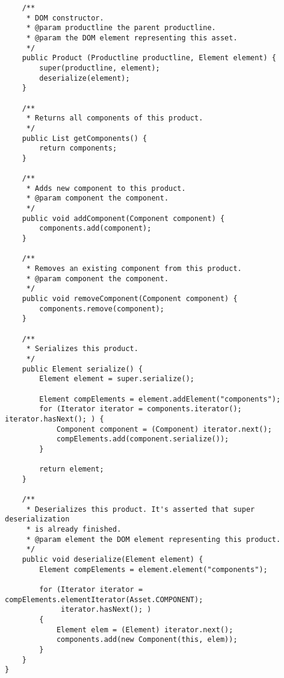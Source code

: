 \begin{verbatim}
	/**
	 * DOM constructor.
	 * @param productline the parent productline.
	 * @param the DOM element representing this asset.
	 */
	public Product (Productline productline, Element element) {
		super(productline, element);
		deserialize(element);
	}
	
	/**
	 * Returns all components of this product.
	 */
	public List getComponents() {
		return components;
	}
	
	/**
	 * Adds new component to this product.
	 * @param component the component.
	 */
	public void addComponent(Component component) {
		components.add(component);
	}

	/**
	 * Removes an existing component from this product.
	 * @param component the component.
	 */
	public void removeComponent(Component component) {
		components.remove(component);
	}

	/**
	 * Serializes this product.
	 */
	public Element serialize() {
		Element element = super.serialize();
		
		Element compElements = element.addElement("components");
		for (Iterator iterator = components.iterator(); iterator.hasNext(); ) {
			Component component = (Component) iterator.next();
			compElements.add(component.serialize());
		}
		
		return element;
	}
	
	/**
	 * Deserializes this product. It's asserted that super deserialization
	 * is already finished.
	 * @param element the DOM element representing this product.
	 */
	public void deserialize(Element element) {
		Element compElements = element.element("components");
		
		for (Iterator iterator = compElements.elementIterator(Asset.COMPONENT);
			 iterator.hasNext(); )
		{
			Element elem = (Element) iterator.next();
			components.add(new Component(this, elem));
		}
	}
}

\end{verbatim}

